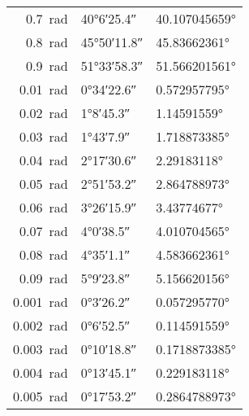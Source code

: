 {{\begin{tabular}{rll}
\SI{0.7}{\radian}	&\ang{40;6;25.4}  &\ang[round-precision=\lungarrotandamento,round-mode=places]{40.107045659}  \\
\SI{0.8}{\radian}	&\ang{45;50;11.8}  &\ang[round-precision=\lungarrotandamento,round-mode=places]{45.83662361}  \\
\SI{0.9}{\radian}	&\ang{51;33;58.3}  &\ang[round-precision=\lungarrotandamento,round-mode=places]{51.566201561}  \\
\midrule
\SI{0.01}{\radian}	&\ang{0;34;22.6}  &\ang[round-precision=\lungarrotandamento,round-mode=places]{0.572957795}  \\
\SI{0.02}{\radian}	&\ang{1;8;45.3}  &\ang[round-precision=\lungarrotandamento,round-mode=places]{1.14591559}  \\
\SI{0.03}{\radian}	&\ang{1;43;7.9}  &\ang[round-precision=\lungarrotandamento,round-mode=places]{1.718873385}  \\
\SI{0.04}{\radian}	&\ang{2;17;30.6}  &\ang[round-precision=\lungarrotandamento,round-mode=places]{2.29183118}  \\
\SI{0.05}{\radian}	&\ang{2;51;53.2}  &\ang[round-precision=\lungarrotandamento,round-mode=places]{2.864788973}  \\
\SI{0.06}{\radian}	&\ang{3;26;15.9}  &\ang[round-precision=\lungarrotandamento,round-mode=places]{3.43774677}  \\
\SI{0.07}{\radian}	&\ang{4;0;38.5}  &\ang[round-precision=\lungarrotandamento,round-mode=places]{4.010704565}  \\
\SI{0.08}{\radian}	&\ang{4;35;1.1}  &\ang[round-precision=\lungarrotandamento,round-mode=places]{4.583662361}  \\
\SI{0.09}{\radian}	&\ang{5;9;23.8}  &\ang[round-precision=\lungarrotandamento,round-mode=places]{5.156620156}  \\
\midrule
\SI{0.001}{\radian}	&\ang{0;3;26.2}  &\ang[round-precision=\lungarrotandamento,round-mode=places]{0.057295770}  \\
\SI{0.002}{\radian}	&\ang{0;6;52.5}  &\ang[round-precision=\lungarrotandamento,round-mode=places]{0.114591559}  \\
\SI{0.003}{\radian}	&\ang{0;10;18.8}  &\ang[round-precision=\lungarrotandamento,round-mode=places]{0.1718873385}  \\
\SI{0.004}{\radian}	&\ang{0;13;45.1}  
&\ang[round-precision=\lungarrotandamento,round-mode=places]{0.229183118}  \\
\SI{0.005}{\radian}	&\ang{0;17;53.2}  &\ang[round-precision=\lungarrotandamento,round-mode=places]{0.2864788973}  \\

\end{tabular}}}
